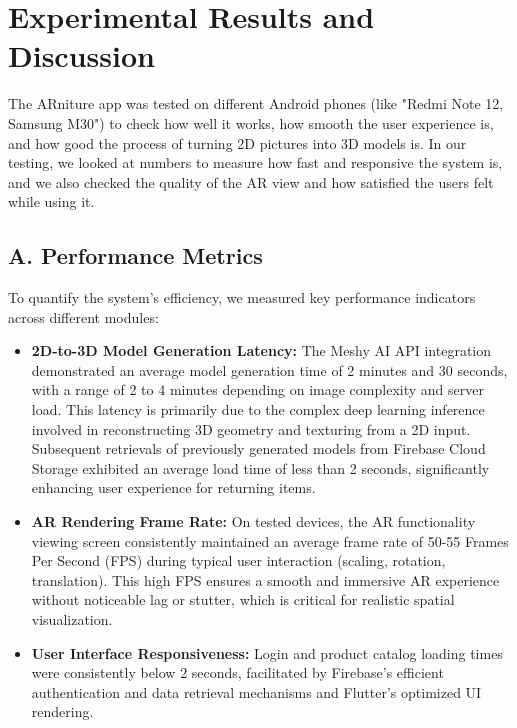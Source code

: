 \documentclass[12pt, a4paper]{article}
\begin{document}
\section{Experimental Results and Discussion}
The ARniture app was tested on different Android phones (like "Redmi Note 12, Samsung M30") to check how well it works, how smooth the user experience is, and how good the process of turning 2D pictures into 3D models is. In our testing, we looked at numbers to measure how fast and responsive the system is, and we also checked the quality of the AR view and how satisfied the users felt while using it.

\subsection{A. Performance Metrics}
To quantify the system's efficiency, we measured key performance indicators across different modules:
\begin{itemize}
  \item \textbf{2D-to-3D Model Generation Latency:} The Meshy AI API integration demonstrated an average model generation time of 2 minutes and 30 seconds, with a range of 2 to 4 minutes depending on image complexity and server load. This latency is primarily due to the complex deep learning inference involved in reconstructing 3D geometry and texturing from a 2D input. Subsequent retrievals of previously generated models from Firebase Cloud Storage exhibited an average load time of less than 2 seconds, significantly enhancing user experience for returning items.
  \item \textbf{AR Rendering Frame Rate:} On tested devices, the AR functionality viewing screen consistently maintained an average frame rate of 50-55 Frames Per Second (FPS) during typical user interaction (scaling, rotation, translation). This high FPS ensures a smooth and immersive AR experience without noticeable lag or stutter, which is critical for realistic spatial visualization.
  \item \textbf{User Interface Responsiveness:} Login and product catalog loading times were consistently below 2 seconds, facilitated by Firebase's efficient authentication and data retrieval mechanisms and Flutter's optimized UI rendering.
\end{itemize}
\end{document}
